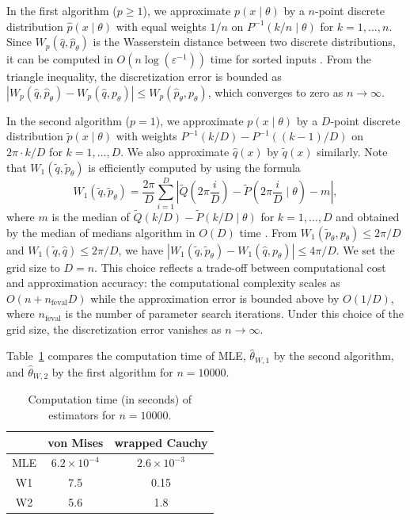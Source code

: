 \documentclass[11pt, a4paper]{article}
\begin{document}
In the first algorithm ($p \geq 1$), we approximate $p(x \mid \theta)$ by a $n$-point discrete distribution $\hat{p}(x \mid \theta)$ with equal weights $1/n$ on $P^{-1}(k/n \mid \theta)$ for $k=1,\dots,n$.
Since $W_p (\hat{q}, \hat{p}_{\theta})$ is the Wasserstein distance between two discrete distributions, it can be computed in $O(n \log (\varepsilon^{-1}))$ time for sorted inputs \cite{Delon}.
From the triangle inequality, the discretization error is bounded as $|W_p(\hat{q},\hat{p}_{\theta})-W_p(\hat{q},{p}_{\theta})| \leq W_p(\hat{p}_{\theta},{p}_{\theta})$, which converges to zero as $n \to \infty$.

In the second algorithm ($p=1$), we approximate $p(x \mid \theta)$ by a $D$-point discrete distribution $\tilde{p}(x \mid \theta)$ with weights $P^{-1}(k/D)-P^{-1}((k-1)/D)$ on $2\pi \cdot k/D$ for $k=1,\dots,D$.
We also approximate $\hat{q}(x)$ by $\tilde{q}(x)$ similarly.
Note that $W_1(\tilde{q},\tilde{p}_{\theta})$ is efficiently computed by using the formula
\[
W_1 (\tilde{q},\tilde{p}_{\theta} ) = \frac{2 \pi}{D} \sum_{i=1}^{D} \left| \tilde{Q} \left( 2 \pi \frac{i}{D} \right) - \tilde{P} \left( 2 \pi \frac{i}{D} \mid \theta \right) - m \right|,
\]
where $m$ is the median of $\tilde{Q} ( k/D ) - \tilde{P} ( k/D \mid \theta )$ for $k=1,\dots,D$ and obtained by the median of medians algorithm in $O(D)$ time \cite{Hundrieser}. 
From $W_1(\tilde{p}_{\theta},p_{\theta}) \leq 2\pi/D$ and $W_1(\tilde{q},\hat{q}) \leq 2\pi/D$, we have $|W_1(\tilde{q},\tilde{p}_{\theta})-W_1(\hat{q},p_{\theta})| \leq 4 \pi/D$.
We set the grid size to $D = n$.
This choice reflects a trade-off between computational cost and approximation accuracy:
the computational complexity scales as $O(n + n_{\mathrm{feval}} D)$ while the approximation error is bounded above by $O(1/D)$, where $n_{\mathrm{feval}}$ is the number of parameter search iterations.
Under this choice of the grid size, the discretization error vanishes as $n \to \infty$.

Table~\ref{tab} compares the computation time of MLE, $\hat{\theta}_{W,1}$ by the second algorithm, and $\hat{\theta}_{W,2}$ by the first algorithm for $n=10000$.

\begin{table}[htbp]
	\caption{Computation time (in seconds) of estimators for $n=10000$.}
	\label{tab}
	\centering
	\begin{tabular}{|c|c|c|}
		\hline
		& von Mises & wrapped Cauchy  \\ \hline
		MLE & $6.2 \times 10^{-4}$ & $2.6 \times 10^{-3}$  \\ \hline
		W1 & 7.5 & 0.15  \\ \hline
		W2 & 5.6 & 1.8  \\ \hline
	\end{tabular}
\end{table}
\end{document}
